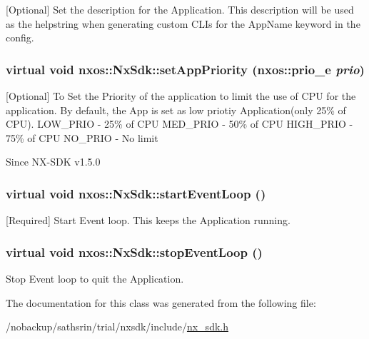 \label{classnxos_1_1NxSdk_a2c6007a383114285951b2d2a062dacec}
\mbox{[}Optional\mbox{]} Set the description for the Application. This description will be used as the helpstring when generating custom CLIs for the AppName keyword in the config. \hypertarget{classnxos_1_1NxSdk_a46d9487216506aa19e5499759f5eaef7}{
\subsubsection[{setAppPriority}]{\setlength{\rightskip}{0pt plus 5cm}virtual void nxos::NxSdk::setAppPriority (nxos::prio\_\-e {\em prio})}}
\label{classnxos_1_1NxSdk_a46d9487216506aa19e5499759f5eaef7}
\mbox{[}Optional\mbox{]} To Set the Priority of the application to limit the use of CPU for the application. By default, the App is set as low priotiy Application(only 25\% of CPU). LOW\_\-PRIO -\/ 25\% of CPU MED\_\-PRIO -\/ 50\% of CPU HIGH\_\-PRIO -\/ 75\% of CPU NO\_\-PRIO -\/ No limit

\begin{DoxySince}{Since}
NX-\/SDK v1.5.0 
\end{DoxySince}
\hypertarget{classnxos_1_1NxSdk_a75ca70643fe325ddf0eea62c1f8c4cc8}{
\subsubsection[{startEventLoop}]{\setlength{\rightskip}{0pt plus 5cm}virtual void nxos::NxSdk::startEventLoop ()}}
\label{classnxos_1_1NxSdk_a75ca70643fe325ddf0eea62c1f8c4cc8}
\mbox{[}Required\mbox{]} Start Event loop. This keeps the Application running. \hypertarget{classnxos_1_1NxSdk_adc80e6f244a7cbc050f9dacbc8018315}{
\subsubsection[{stopEventLoop}]{\setlength{\rightskip}{0pt plus 5cm}virtual void nxos::NxSdk::stopEventLoop ()}}
\label{classnxos_1_1NxSdk_adc80e6f244a7cbc050f9dacbc8018315}
Stop Event loop to quit the Application. 

The documentation for this class was generated from the following file:\begin{DoxyCompactItemize}
\item 
/nobackup/sathsrin/trial/nxsdk/include/\hyperlink{nx__sdk_8h}{nx\_\-sdk.h}\end{DoxyCompactItemize}
